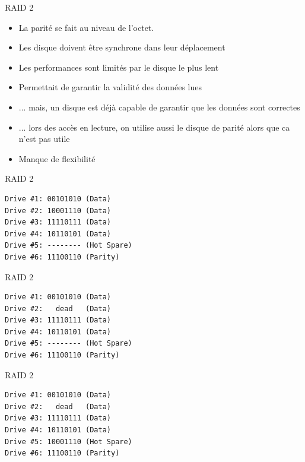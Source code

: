 \begin{frame}[fragile=singleslide]{RAID 2}
  \begin{itemize}
  \item La parité se fait au niveau de l'octet.
  \item Les disque doivent être synchrone dans leur déplacement
  \item Les performances sont limités par le disque le plus lent
  \item Permettait de garantir la validité des données lues
  \item  ... mais,  un disque  est déjà  capable de  garantir  que les
    données sont correctes
  \item ... lors  des accès en lecture, on utilise  aussi le disque de
    parité alors que ca n'est pas utile
  \item Manque de flexibilité
  \end{itemize}
\end{frame}

\begin{frame}[fragile=singleslide]{RAID 2}
  \begin{lstlisting}
Drive #1: 00101010 (Data)
Drive #2: 10001110 (Data)
Drive #3: 11110111 (Data)
Drive #4: 10110101 (Data)
Drive #5: -------- (Hot Spare)
Drive #6: 11100110 (Parity)
  \end{lstlisting}
\end{frame}

\begin{frame}[fragile=singleslide]{RAID 2}
  \begin{lstlisting}
Drive #1: 00101010 (Data)
Drive #2:   dead   (Data)
Drive #3: 11110111 (Data)
Drive #4: 10110101 (Data)
Drive #5: -------- (Hot Spare)
Drive #6: 11100110 (Parity)
\end{lstlisting}
\end{frame}

\begin{frame}[fragile=singleslide]{RAID 2}
  \begin{lstlisting}
Drive #1: 00101010 (Data)
Drive #2:   dead   (Data)
Drive #3: 11110111 (Data)
Drive #4: 10110101 (Data)
Drive #5: 10001110 (Hot Spare)
Drive #6: 11100110 (Parity)
\end{lstlisting}
\end{frame}


